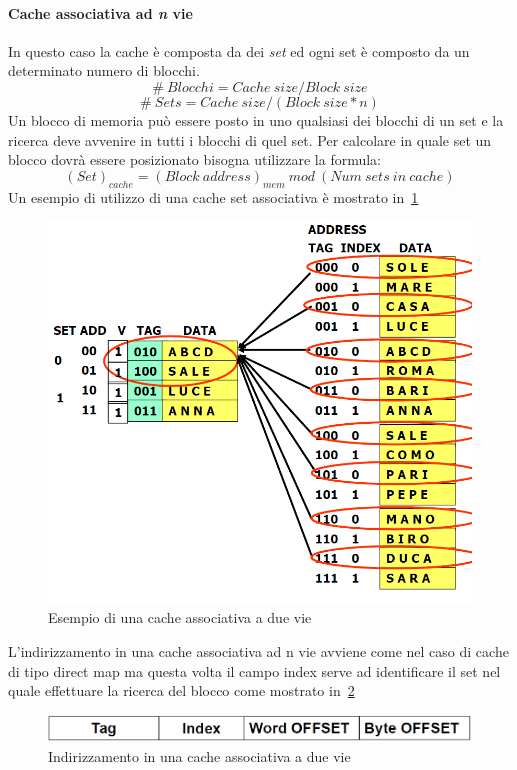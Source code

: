 \paragraph{Cache associativa ad \emph{n} vie}
In questo caso la cache è composta da dei \emph{set} ed ogni set è composto da un determinato numero di blocchi.
$$\# \ Blocchi = Cache \ size / Block \ size$$
$$\# \ Sets = Cache \ size / (Block \ size * n)$$
Un blocco di memoria può essere posto in uno qualsiasi dei blocchi di un set e la ricerca deve avvenire in tutti i blocchi di quel set. Per calcolare in quale set un blocco dovrà essere posizionato bisogna utilizzare la formula:
$$(Set)_{cache} = (Block \ address)_{mem} \ mod \ (Num \ sets \ in \ cache)$$
Un esempio di utilizzo di una cache set associativa è mostrato in \figurename\,\ref{fig:setexemp}
\begin{figure}[htb]
\centering
\includegraphics[scale=0.5]{img/setexemp.png}
\caption{Esempio di una cache associativa a due vie}\label{fig:setexemp}
\end{figure}
L'indirizzamento in una cache associativa ad n vie avviene come nel caso di cache di tipo direct map ma questa volta il campo index serve ad identificare il set nel quale effettuare la ricerca del blocco come mostrato in \figurename\,\ref{fig:setaddressing}
\begin{figure}[htb]
\centering
\includegraphics[scale=0.5]{img/setaddressing.png}
\caption{Indirizzamento in una cache associativa a due vie}\label{fig:setaddressing}
\end{figure}
